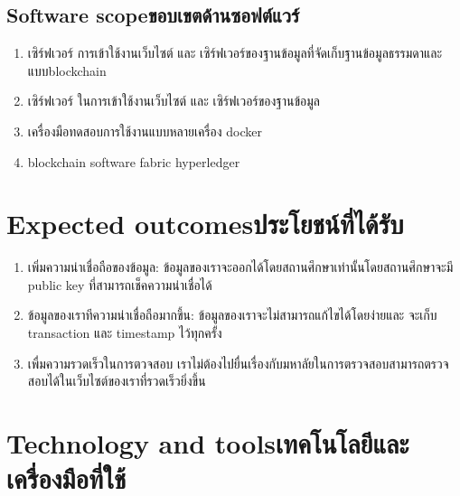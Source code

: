 \subsection{\ifenglish Software scope\else ขอบเขตด้านซอฟต์แวร์\fi}
\begin{enumerate}
    \item เซิร์ฟเวอร์ การเข้าใช้งานเว็บไซต์ และ เซิร์ฟเวอร์ของฐานข้อมูลที่จัดเก็บฐานข้อมูลธรรมดาและแบบblockchain
    \item เซิร์ฟเวอร์ ในการเข้าใช้งานเว็บไซต์ และ เซิร์ฟเวอร์ของฐานข้อมูล
    \item เครื่องมือทดสอบการใช้งานแบบหลายเครื่อง docker
    \item blockchain software fabric hyperledger
\end{enumerate}
\section{\ifenglish Expected outcomes\else ประโยชน์ที่ได้รับ\fi}
\begin{enumerate}
    \item เพิ่มความน่าเชื่อถือของข้อมูล: ข้อมูลของเราจะออกได้โดยสถานศึกษาเท่านั้นโดยสถานศึกษาจะมี
     public key ที่สามารถเช็คความน่าเชื่อได้
    \item ข้อมูลของเราทีความน่าเชื่อถือมากขึ้น: ข้อมูลของเราจะไม่สามารถแก้ไขได้โดยง่ายและ
    จะเก็บ transaction และ timestamp ไว้ทุกครั้ง
    \item เพื่มความรวดเร็วในการตวจสอบ เราไม่ต้องไปยื่นเรื่องกับมหาลัยในการตรวจสอบสามารถตรวจสอบได้ในเว็บไซต์ของเราที่รวดเร็วยิ่งขึ้น
\end{enumerate}
\section{\ifenglish Technology and tools\else เทคโนโลยีและเครื่องมือที่ใช้\fi}

